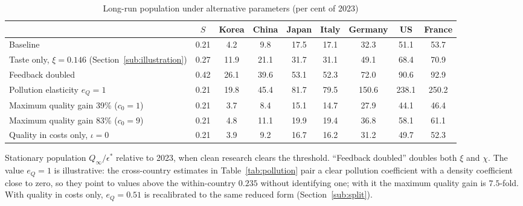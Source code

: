 \documentclass[11pt]{article}
\begin{document}
\begin{table}[h!]\centering
\begin{threeparttable}
\caption{Long-run population under alternative parameters (per cent of 2023)}
\label{tab:sens}
\footnotesize
\begin{tabular}{lcccccccc}
\toprule
 & $S$ & Korea & China & Japan & Italy & Germany & US & France\\
\midrule
Baseline                                & 0.21 & 4.2 & 9.8 & 17.5 & 17.1 & 32.3 & 51.1 & 53.7\\
Taste only, $\xi=0.146$ (Section~\ref{sub:illustration}) & 0.27 & 11.9 & 21.1 & 31.7 & 31.1 & 49.1 & 68.4 & 70.9\\
Feedback doubled                        & 0.42 & 26.1 & 39.6 & 53.1 & 52.3 & 72.0 & 90.6 & 92.9\\
Pollution elasticity $e_Q=1$            & 0.21 & 19.8 & 45.4 & 81.7 & 79.5 & 150.6 & 238.1 & 250.2\\
Maximum quality gain 39\% ($c_0=1$)     & 0.21 & 3.7 & 8.4 & 15.1 & 14.7 & 27.9 & 44.1 & 46.4\\
Maximum quality gain 83\% ($c_0=9$)     & 0.21 & 4.8 & 11.1 & 19.9 & 19.4 & 36.8 & 58.1 & 61.1\\
Quality in costs only, $\iota=0$         & 0.21 & 3.9 & 9.2 & 16.7 & 16.2 & 31.2 & 49.7 & 52.3\\
\bottomrule
\end{tabular}
\begin{tablenotes}\footnotesize
\item Stationary population $Q_\infty/\epsilon^\ast$ relative to 2023, when clean research clears the
threshold. ``Feedback doubled''
doubles both $\xi$ and $\chi$. The value $e_Q=1$ is illustrative: the cross-country estimates in Table~\ref{tab:pollution} pair a
clear pollution coefficient with a density coefficient close to zero, so they point to values above the
within-country $0.235$ without identifying one; with it the
maximum quality gain is $7.5$-fold. With quality in costs only, $e_Q=0.51$ is recalibrated to the same
reduced form (Section~\ref{sub:split}).
\end{tablenotes}
\end{threeparttable}
\end{table}
\end{document}
